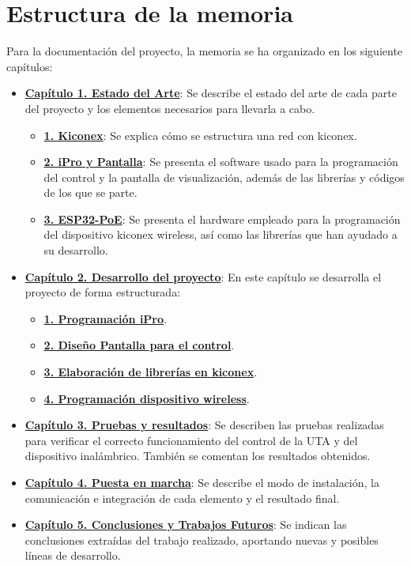 \section{Estructura de la memoria}
\label{sec:estructura}

Para la documentación del proyecto, la memoria se ha organizado en los siguiente capítulos:

\begin{itemize}
	\item \textbf{\hyperref[chap:estadoArte]{Capítulo 1. Estado del Arte}}: Se describe el estado del arte de cada parte del proyecto y los elementos necesarios para llevarla a cabo.
  \begin{itemize}
    \item \textbf{\hyperref[sec:kiconex]{1. Kiconex}}: Se explica cómo se estructura una red con kiconex.
    \item \textbf{\hyperref[sec:ipro]{2. iPro y Pantalla}}: Se presenta el software usado para la programación del control y la pantalla de visualización, además de las librerías y códigos de los que se parte.
    \item \textbf{\hyperref[sec:esp32poe]{3. ESP32-PoE}}: Se presenta el hardware empleado para la programación del dispositivo kiconex wireless, así como las librerías que han ayudado a su desarrollo.
  \end{itemize}
	\item \textbf{\hyperref[chap:desarrollo]{Capítulo 2. Desarrollo del proyecto}}: En este capítulo se desarrolla el proyecto de forma estructurada:
  \begin{itemize}
    \item \textbf{\hyperref[sec:programacionipro]{1. Programación iPro}}.
    \item \textbf{\hyperref[sec:programacionpantalla]{2. Diseño Pantalla para el control}}.
    \item \textbf{\hyperref[sec:librerias]{3. Elaboración de librerías en kiconex}}.
    \item \textbf{\hyperref[sec:programacionesp32]{4. Programación dispositivo wireless}}.
  \end{itemize}

	\item \textbf{\hyperref[chap:resultados]{Capítulo 3. Pruebas y resultados}}: Se describen las pruebas realizadas para verificar el correcto funcionamiento del control de la UTA y del dispositivo inalámbrico. También se comentan los resultados obtenidos.
	\item \textbf{\hyperref[chap:puestaEnMarcha]{Capítulo 4. Puesta en marcha}}: Se describe el modo de instalación, la comunicación e integración de cada elemento y el resultado final.
	\item \textbf{\hyperref[chap:conclusiones]{Capítulo 5. Conclusiones y Trabajos Futuros}}: Se indican las conclusiones extraídas del trabajo realizado, aportando nuevas y posibles líneas de desarrollo.
\end{itemize}









